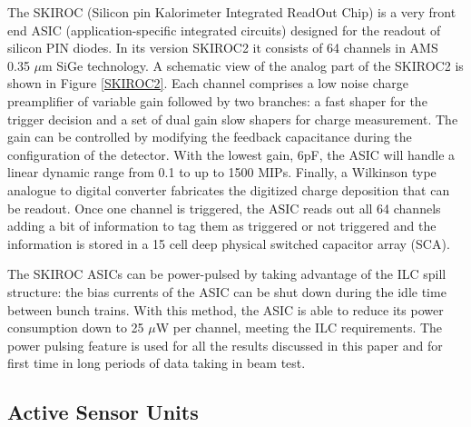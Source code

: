 \documentclass[a4paper,11pt]{article}
\begin{document}
The SKIROC\cite{Callier:2011zz} (Silicon pin Kalorimeter Integrated ReadOut Chip) is a
very front end ASIC (application-specific integrated circuits)
designed for the readout of silicon PIN diodes.
In its version SKIROC2 it consists of 64 channels in AMS 0.35 $\mu$m SiGe technology.
A schematic view of the analog part of the SKIROC2 is shown in Figure \ref{SKIROC2}.
Each channel comprises a low noise charge preamplifier of variable gain followed by two branches:
a fast shaper for the trigger decision and a set of dual gain slow shapers for charge measurement. 
The gain can be controlled by modifying the feedback capacitance during the configuration of the detector.
With the lowest gain, 6pF, the ASIC will handle a linear dynamic range from 0.1 to up to 1500 MIPs. 
Finally, a Wilkinson type analogue to digital converter fabricates the digitized charge deposition that can be readout. 
Once one channel is triggered, the ASIC reads out all 64 channels adding a bit of information to tag them as
triggered or not triggered and the information is stored in a 15 cell deep physical switched capacitor array (SCA).

The SKIROC ASICs can be power-pulsed by taking advantage of the ILC spill structure: 
the bias currents of the ASIC can be shut down during the idle time between bunch trains.
With this method, the ASIC is able to reduce its power consumption down to 25 $\mu$W per channel,
meeting the ILC requirements. 
The power pulsing feature is used for all the results discussed in this paper
and for first time in long periods of data taking in beam test.



\subsection{Active Sensor Units}
\label{sec:ASU}
\end{document}
